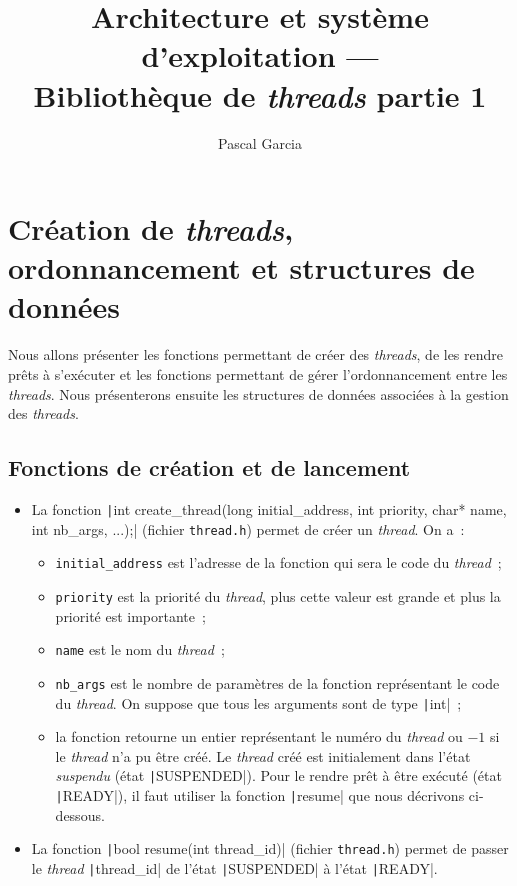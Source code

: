 \documentclass[a4paper]{article}
\title{Architecture et système d'exploitation --- \\Bibliothèque de \emph{threads} partie 1}
\author{Pascal Garcia}
\begin{document}
\maketitle

\renewcommand{\labelitemi}{$\bullet$}
\renewcommand{\labelitemii}{$\star$}

\section{Création de \emph{threads}, ordonnancement et structures de données}

Nous allons présenter les fonctions permettant de créer des \emph{threads}, de les rendre prêts à s'exécuter et les fonctions
permettant de gérer l'ordonnancement entre les \emph{threads}.
Nous présenterons ensuite les structures de données associées à la gestion des \emph{threads}.

\subsection{Fonctions de création et de lancement}

\begin{itemize}

\item La fonction \texttt|int create_thread(long initial_address, int priority, char* name, int nb_args, ...);| 
(fichier \verb+thread.h+) permet de créer un \emph{thread}. On a~:
\begin{itemize}
\item \verb+initial_address+ est l'adresse de la fonction qui sera le code du \emph{thread}~;
\item \verb+priority+ est la priorité du \emph{thread}, plus cette valeur est grande et plus la priorité est importante~;
\item \verb+name+ est le nom du \emph{thread}~;
\item \verb+nb_args+ est le nombre de paramètres de la fonction représentant le code du \emph{thread}. On suppose que
tous les arguments sont de type \texttt|int|~;
\item la fonction retourne un entier représentant le numéro du \emph{thread} ou $-1$ si le \emph{thread} n'a pu être créé.
Le \emph{thread} créé est initialement dans l'état \textit{suspendu} (état \texttt|SUSPENDED|). Pour le rendre prêt
à être exécuté (état \texttt|READY|), il faut utiliser la fonction \texttt|resume| que nous décrivons ci-dessous.
\end{itemize}

\item La fonction \texttt|bool resume(int thread_id)| (fichier \verb+thread.h+)  permet de passer le \emph{thread} 
\texttt|thread_id| de l'état \texttt|SUSPENDED| à l'état \texttt|READY|.\\

\end{itemize}
\end{document}
